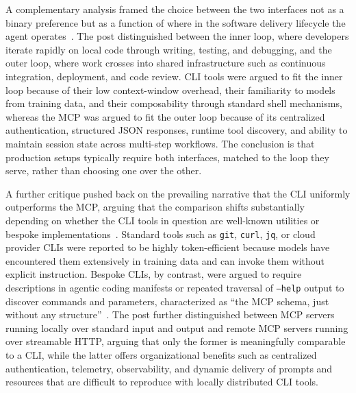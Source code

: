 \documentclass[
english,                 %
bibtex,                  %
includeExtraAbstracts, %
]{kththesis}
\numberwithin{listing}{chapter}
\begin{document}
A complementary analysis framed the choice between the two interfaces not as a binary preference but as a function of where in the software delivery lifecycle the agent operates~\cite{schmitt_mcp_2026}. The post distinguished between the inner loop, where developers iterate rapidly on local code through writing, testing, and debugging, and the outer loop, where work crosses into shared infrastructure such as continuous integration, deployment, and code review. \gls{CLI} tools were argued to fit the inner loop because of their low context-window overhead, their familiarity to models from training data, and their composability through standard shell mechanisms, whereas the \gls{MCP} was argued to fit the outer loop because of its centralized authentication, structured \gls{JSON} responses, runtime tool discovery, and ability to maintain session state across multi-step workflows. The conclusion is that production setups typically require both interfaces, matched to the loop they serve, rather than choosing one over the other.

A further critique pushed back on the prevailing narrative that the \gls{CLI} uniformly outperforms the \gls{MCP}, arguing that the comparison shifts substantially depending on whether the \gls{CLI} tools in question are well-known utilities or bespoke implementations~\cite{chen_mcp_2026}. Standard tools such as \texttt{git}, \texttt{curl}, \texttt{jq}, or cloud provider \glspl{CLI} were reported to be highly token-efficient because models have encountered them extensively in training data and can invoke them without explicit instruction. Bespoke \glspl{CLI}, by contrast, were argued to require descriptions in agentic coding manifests or repeated traversal of \texttt{--help} output to discover commands and parameters, characterized as ``the \gls{MCP} schema, just without any structure''~\cite{chen_mcp_2026}. The post further distinguished between \gls{MCP} servers running locally over standard input and output and remote \gls{MCP} servers running over streamable \gls{HTTP}, arguing that only the former is meaningfully comparable to a \gls{CLI}, while the latter offers organizational benefits such as centralized authentication, telemetry, observability, and dynamic delivery of prompts and resources that are difficult to reproduce with locally distributed \gls{CLI} tools.
\end{document}
